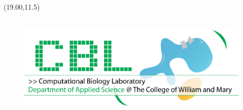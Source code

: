 \documentclass[a0]{a0poster}
\def\Ca{Ca$^{2+}$}
\begin{document}
\begin{textblock}{1}(19.00,11.5)
\begin{figure}
\includegraphics[height=2in]{pics/CBLlogo2}
\end{figure}
\end{textblock}




\end{document}
